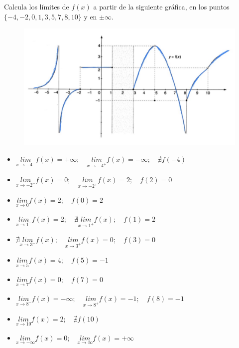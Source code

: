 	   \begin{ejem} Calcula los límites de $f(x)$ a partir de la siguiente gráfica, en los puntos $\{-4, -2, 0, 1, 3, 5, 7, 8, 10 \}$ y en $\pm \infty$.
	   
	   \begin{figure}[H]
			\centering
			\includegraphics[width=.95
			\textwidth]{imagenes/imagenes03/T03IM02.png}
		\end{figure}
	   	
	   	\begin{itemize}
	   		\item $\underset {x \to -4^-} {lim} {f(x)}= +\infty; \quad \underset {x \to -4^+} {lim} {f(x)}=-\infty; \quad \nexists f(-4) $
	   		\item $\underset {x\to -2^-} {lim} {f(x)}=0; \quad \underset {x \to -2^+} {lim} {f(x)}=2; \quad f(2)=0$
	   		\item $\underset {x \to 0} {lim} {f(x)}=2; \quad f(0)=2$
	   		\item $\underset {x \to 1^- } {lim} {f(x)}=2; \quad \nexists \underset {x \to 1^+} {lim} {f(x)}; \quad f(1)=2$
	   		\item $\nexists \underset {x \to 3^-} {lim} {f(x)}; \quad \underset {x \to 3^+ } {lim} {f(x)}= 0; \quad f(3)=0 $
	   		\item $\underset {x \to 5} {lim} {f(x)}=4; \quad f(5)=-1$
	   		\item $\underset {x \to 7} {lim} {f(x)}=0; \quad f(7)=0$
	   		\item $\underset {x \to 8^-} {lim} {f(x)}=-\infty; \quad \underset {x \to 8^+} {lim} {f(x)}=-1; \quad f(8)=-1$
	   		\item $\underset {x \to 10} {lim} {f(x)}=2; \quad \nexists f(10)$
	   		\item $\underset {x \to -\infty}{lim}{f(x)}=0; \quad \underset {x \to \infty}{lim}{f(x)}=+\infty$
	   	\end{itemize}
	   	
	   \end{ejem}

